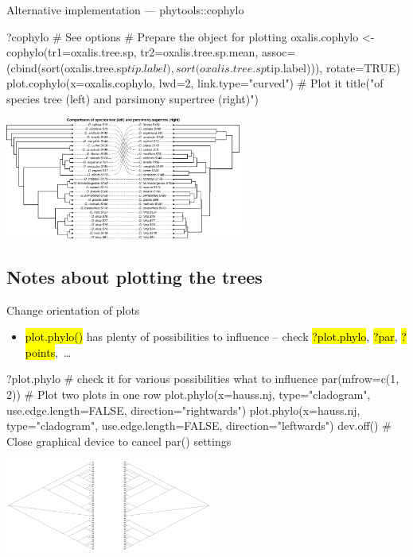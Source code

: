 \documentclass[compress, ucs, xelatex, 11pt, xcolor=svgnames,
  hyperref={
    bookmarks=true,
    unicode=true,
    colorlinks=true,
    pdftitle={Molecular data in R},
    plainpages=false,
    pdfauthor={Vojtech Zeisek},
    pdfsubject={Course about phylogeny and evolution in R},
    pdfcreator={XeLaTeX},
    pdfkeywords={R, evolution, phylogeny, molecular data},
    linkcolor=Tomato,
    anchorcolor=SaddleBrown,
    citecolor=Goldenrod,
    filecolor=DarkMagenta,
    menucolor=Sienna,
    urlcolor=DarkTurquoise,
    pdftex},
  url={hyphens, lowtilde} %
  ]{beamer}
\renewcommand{\texttt}[1]{\hl{\ttfamily #1}}
\begin{document}
\begin{frame}[fragile]{Alternative implementation --- phytools::cophylo}
  \begin{spluscode}
    ?cophylo # See options
    # Prepare the object for plotting
    oxalis.cophylo <- cophylo(tr1=oxalis.tree.sp, tr2=oxalis.tree.sp.mean,
      assoc=(cbind(sort(oxalis.tree.sp$tip.label),
      sort(oxalis.tree.sp$tip.label))), rotate=TRUE)
    plot.cophylo(x=oxalis.cophylo, lwd=2, link.type="curved") # Plot it
    title("\nComparisson of species tree (left) and parsimony supertree
      (right)")
  \end{spluscode}
  \begin{center}
    \includegraphics[height=4cm]{cophylo.png}
  \end{center}
\end{frame}

\subsection{Notes about plotting the trees}

\begin{frame}[fragile]{Change orientation of plots}
  \begin{itemize}
    \item \alert{\texttt{plot.phylo()} has plenty of possibilities to influence -- check \texttt{?plot.phylo}, \texttt{?par}, \texttt{?points},~\ldots}
  \end{itemize}
  \begin{spluscode}
    ?plot.phylo # check it for various possibilities what to influence
    par(mfrow=c(1, 2)) # Plot two plots in one row
    plot.phylo(x=hauss.nj, type="cladogram", use.edge.length=FALSE,
      direction="rightwards")
    plot.phylo(x=hauss.nj, type="cladogram", use.edge.length=FALSE,
      direction="leftwards")
    dev.off() # Close graphical device to cancel par() settings
  \end{spluscode}
  \begin{center}
    \includegraphics[height=3cm]{lr.png}
  \end{center}
\end{frame}
\end{document}
